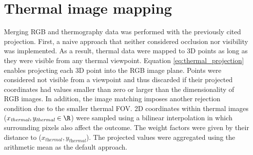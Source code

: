 \section{Thermal image mapping}

Merging RGB and thermography data was performed with the previously cited projection. First, a naive approach that neither considered occlusion nor visibility was implemented. As a result, thermal data were mapped to 3D points as long as they were visible from any thermal viewpoint. Equation \ref{eq:thermal_projection} enables projecting each 3D point into the RGB image plane. Points were considered not visible from a viewpoint and thus discarded if their projected coordinates had values smaller than zero or larger than the dimensionality of RGB images. In addition, the image matching imposes another rejection condition due to the smaller thermal FOV. 2D coordinates within thermal images ($x_{\textit{thermal}}, y_{\textit{thermal}} \in \R$) were sampled using a bilinear interpolation in which surrounding pixels also affect the outcome. The weight factors were given by their distance to ($x_{\textit{thermal}}, y_{\textit{thermal}}$). The projected values were aggregated using the arithmetic mean as the default approach.

